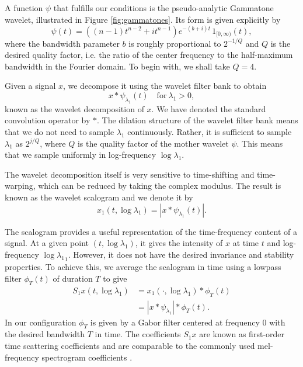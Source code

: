 \documentclass{article}
\newcommand{\lau}{{\lambda_1}}
\begin{document}
\begin{sloppy}
A function $\psi$ that fulfills our conditions is the pseudo-analytic Gammatone wavelet, illustrated in Figure \ref{fig:gammatones}. Its form is given explicitly by
\begin{equation}
	\psi(t) = ((n-1)t^{n-2}+ i t^{n-1})e^{-(b + i) t}\, 1_{[0,\infty)}(t),
\end{equation}
where the bandwidth parameter $b$ is roughly proportional to $2^{-1/Q}$ and $Q$ is the desired quality factor, i.e. the ratio of the center frequency to the half-maximum bandwidth in the Fourier domain. To begin with, we shall take $Q = 4$.

Given a signal $x$, we decompose it using the wavelet filter bank to obtain
\begin{equation}
	x \ast \psi_\lau(t) \quad \mathrm{for~}\lau>0,
\end{equation}
known as the wavelet decomposition of $x$. We have denoted the standard convolution operator by $\ast$. The dilation structure of the wavelet filter bank means that we do not need to sample $\lau$ continuously. Rather, it is sufficient to sample $\lau$ as $2^{j/Q}$, where $Q$ is the quality factor of the mother wavelet $\psi$. This means that we sample uniformly in log-frequency $\log \lau$.

The wavelet decomposition itself is very sensitive to time-shifting and time-warping, which can be reduced by taking the complex modulus. The result is known as the wavelet scalogram and we denote it by
\begin{equation}
	x_1(t, \log \lau) = | x \ast \psi_\lau(t) |.
\end{equation}

The scalogram provides a useful representation of the time-frequency content of a signal. At a given point $(t, \log \lau)$, it gives the intensity of $x$ at time $t$ and log-frequency $\log \lau_1$. However, it does not have the desired invariance and stability properties. To achieve this, we average the scalogram in time using a lowpass filter $\phi_T(t)$ of duration $T$ to give
\begin{align}
	\nonumber
	S_1 x(t, \log \lau) &= x_1(\cdot, \log \lau) \ast \phi_T(t) \\
	&= | x \ast \psi_\lau | \ast \phi_T(t).
\end{align}
In our configuration $\phi_T$ is given by a Gabor filter centered at frequency $0$ with the desired bandwidth $T$ in time. The coefficients $S_1 x$ are known as first-order time scattering coefficients and are comparable to the commonly used mel-frequency spectrogram coefficients \cite{davis-mermelstein}.


\end{sloppy}
\end{document}
